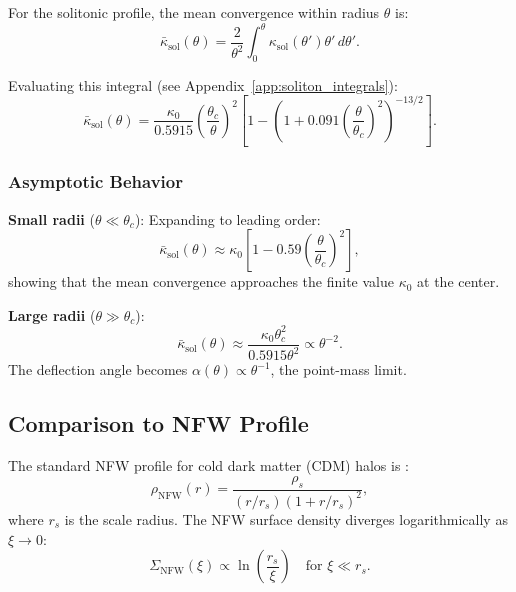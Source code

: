 \documentclass[11pt,a4paper]{article}
\theoremstyle{definition}
\theoremstyle{remark}
\begin{document}
For the solitonic profile, the mean convergence within radius $\theta$ is:
\begin{equation}
\bar{\kappa}_{\mathrm{sol}}(\theta) = \frac{2}{\theta^2} \int_0^\theta \kappa_{\mathrm{sol}}(\theta') \theta' \, d\theta'.
\end{equation}

Evaluating this integral (see Appendix~\ref{app:soliton_integrals}):
\begin{equation}
\label{eq:kappa_bar_soliton}
\bar{\kappa}_{\mathrm{sol}}(\theta) = \frac{\kappa_0}{0.5915} \left(\frac{\theta_c}{\theta}\right)^2 \left[1 - \left(1 + 0.091\left(\frac{\theta}{\theta_c}\right)^2\right)^{-13/2}\right].
\end{equation}

\subsubsection{Asymptotic Behavior}

\textbf{Small radii} ($\theta \ll \theta_c$): Expanding to leading order:
\begin{equation}
\bar{\kappa}_{\mathrm{sol}}(\theta) \approx \kappa_0 \left[1 - 0.59\left(\frac{\theta}{\theta_c}\right)^2\right],
\end{equation}
showing that the mean convergence approaches the finite value $\kappa_0$ at the center.

\textbf{Large radii} ($\theta \gg \theta_c$):
\begin{equation}
\bar{\kappa}_{\mathrm{sol}}(\theta) \approx \frac{\kappa_0 \theta_c^2}{0.5915 \theta^2} \propto \theta^{-2}.
\end{equation}
The deflection angle becomes $\alpha(\theta) \propto \theta^{-1}$, the point-mass limit.

\subsection{Comparison to NFW Profile}
\label{sec:nfw_comparison}

The standard NFW profile for cold dark matter (CDM) halos is \cite{Navarro1997}:
\begin{equation}
\label{eq:nfw_profile}
\rho_{\mathrm{NFW}}(r) = \frac{\rho_s}{(r/r_s)(1 + r/r_s)^2},
\end{equation}
where $r_s$ is the scale radius. The NFW surface density diverges logarithmically as $\xi \to 0$:
\begin{equation}
\Sigma_{\mathrm{NFW}}(\xi) \propto \ln\left(\frac{r_s}{\xi}\right) \quad \text{for } \xi \ll r_s.
\end{equation}
\end{document}
